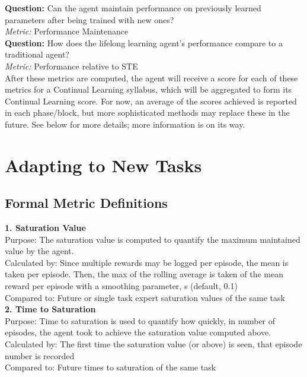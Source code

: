 \textbf{Question:} Can the agent maintain performance on previously learned parameters after being trained with new ones?\\
\textit{Metric:} Performance Maintenance\\[0.1in]


\textbf{Question:} How does the lifelong learning agent's performance compare to a traditional agent?\\
\textit{Metric:} Performance relative to STE \\[0.2in]
            
            

After these metrics are computed, the agent will receive a score for  each of these metrics for a Continual Learning syllabus, which will be aggregated to form its Continual Learning score. For now, an average of the scores achieved is reported in each phase/block, but more sophisticated methods may replace these in the future. See below for more details; more information is on its way.
    

\section{Adapting to New Tasks}


\subsection*{Formal Metric Definitions}

\textbf{1. Saturation Value}\\
Purpose: The saturation value is computed to quantify the maximum maintained value by the agent.\\
Calculated by: Since multiple rewards may be logged per episode, the mean is taken per episode. Then, the max of the rolling average is taken of the mean reward per episode with a smoothing parameter, s (default, 0.1)\\
Compared to: Future or single task expert saturation values of the same task\\[0.1in]         


\textbf{2. Time to Saturation}\\
Purpose: Time to saturation is used to quantify how quickly, in number of episodes, the agent took to achieve the saturation value computed above.\\
Calculated by: The first time the saturation value (or above) is seen, that episode number is recorded\\
Compared to: Future times to saturation of the same task\\[0.1in]


